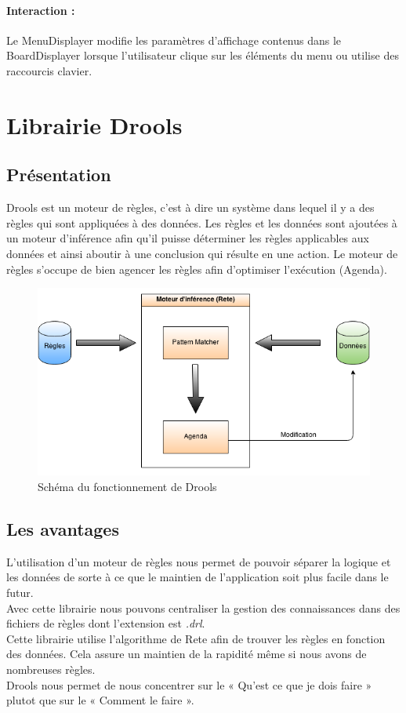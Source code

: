 			\paragraph{Interaction :}
			Le MenuDisplayer modifie les paramètres d'affichage contenus dans le BoardDisplayer lorsque l'utilisateur clique
			sur les éléments du menu ou utilise des raccourcis clavier.


	\clearpage

	\section{Librairie Drools}

		\subsection{Présentation}
			Drools est un moteur de règles, c'est à dire un système dans lequel il y a des règles qui sont appliquées à des données. 
			Les règles et les données sont ajoutées	à un moteur d'inférence afin qu'il puisse déterminer les règles applicables aux données et ainsi aboutir à une conclusion qui résulte en une action.
			Le moteur de règles s'occupe de bien agencer les règles afin d'optimiser l'exécution (Agenda).

		
			\begin{figure}[!h]
			    \caption{Schéma du fonctionnement de Drools}
			    \centerline{\includegraphics[scale=0.7]{images/architecture/drools_schema.png}}
			\end{figure}


		\subsection{Les avantages}
			L'utilisation d'un moteur de règles nous permet de pouvoir séparer la logique et les données de sorte à ce que le maintien de l'application soit plus facile dans le futur.
			\\
			Avec cette librairie nous pouvons centraliser la gestion des connaissances dans des fichiers de règles dont l'extension est {\itshape .drl}.
			\\
			Cette librairie utilise l'algorithme de Rete afin de trouver les règles en fonction des données. Cela assure un maintien de la rapidité même si nous avons de nombreuses règles.
			\\
			Drools nous permet de nous concentrer sur le « Qu'est ce que je dois faire » plutot que sur le « Comment le faire ».


